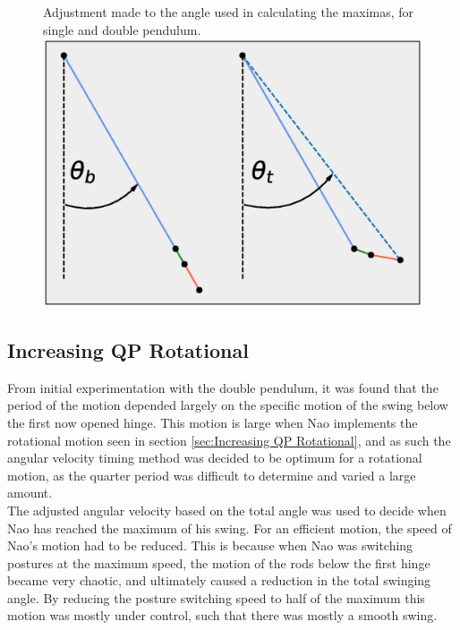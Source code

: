 \documentclass[11pt]{article}
\begin{document}
    \begin{figure}[!htb]
        \centering
        \captionbox
             {Adjustment made to the angle used in calculating the maximas, for single and double pendulum.\label{fig:TotalAngleDiagram}}
             {\includegraphics[width=1.0\textwidth]{TotalAngleDiagram.eps}}
    \end{figure}
    
\clearpage

\subsection{Increasing QP Rotational}
From initial experimentation with the double pendulum, it was found that the period of the motion depended largely on the specific motion of the swing below the first now opened hinge. This motion is large when Nao implements the rotational motion seen in section \ref{sec:Increasing QP Rotational}, and as such the angular velocity timing method was decided to be optimum for a rotational motion, as the quarter period was difficult to determine and varied a large amount.\\

The adjusted angular velocity based on the total angle was used to decide when Nao has reached the maximum of his swing. For an efficient motion, the speed of Nao's motion had to be reduced. This is because when Nao was switching postures at the maximum speed, the motion of the rods below the first hinge became very chaotic, and ultimately caused a reduction in the total swinging angle. By reducing the posture switching speed to half of the maximum this motion was mostly under control, such that there was mostly a smooth swing.\\
\end{document}
